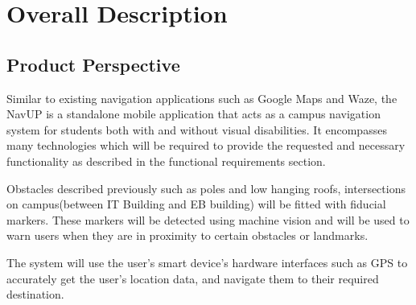 \section{Overall Description}

	\subsection{Product Perspective}
		Similar to existing navigation applications such as Google Maps and Waze, the NavUP is a standalone mobile application that acts as a campus navigation system for students both with and without visual disabilities. It encompasses many technologies which will be required to provide the requested and necessary functionality as described in the functional requirements section.\\ \par\noindent
		Obstacles described previously such as poles and low hanging roofs, intersections on campus(between IT Building and EB building) will be fitted with fiducial markers. These markers will be detected using machine vision and will be used to warn users when they are in proximity to certain obstacles or landmarks.\par\noindent
		The system will use the user's smart device's hardware interfaces such as GPS to accurately get the user's location data, and navigate them to their required destination.\\
		
